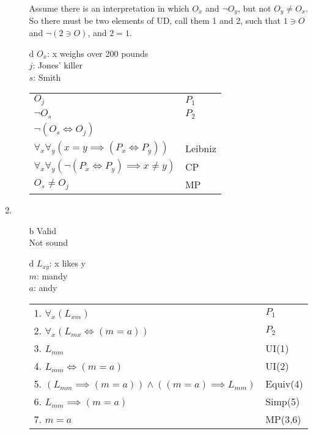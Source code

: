 \documentclass{article}
\begin{document}
\begin{enumerate}
\begin{enumerate}
					Assume there is an interpretation in which $O_x$ and $\lnot O_y$, but not $O_y \neq O_x$. So there must be two elements of UD, call them 1 and 2, such that $1 \ni O$ and $\lnot (2 \ni O)$, and $2 = 1$. 
				\item[d]
					$O_x$: x weighs over 200 pounds\\
					$j$: Jones' killer\\
					$s$: Smith\\
					\begin{tabular}{l l}
						$O_j$ & $P_1$\\
						$\lnot O_s$ & $P_2$\\
						$\lnot (O_s \iff O_j)$ & \\
						$\forall _x \forall _y(x=y \implies (P_x \iff P_y))$ & Leibniz\\
						$\forall _x \forall _y(\lnot (P_x \iff P_y) \implies x \neq y)$ & CP\\
						$O_s \neq O_j$ & MP\\
					\end{tabular}
			\end{enumerate}
		\item
			\begin{enumerate}
				\item[b]
					Valid\\
					Not sound	
				\item[d]
					$L_{xy}$: x likes y\\ 
					$m$: mandy\\
					$a$: andy\\
					\begin{tabular}{l l}
						1. $\forall _x(L_{xm})$ & $P_1$\\
						2. $\forall _x(L_{mx} \iff (m = a))$ & $P_2$\\
						3. $L_{mm}$ & UI(1)\\
						4. $L_{mm} \iff (m = a)$ & UI(2)\\
						5. $(L_{mm} \implies (m = a)) \land ((m = a) \implies L_{mm})$ & Equiv(4)\\
						6. $L_{mm} \implies (m = a)$ & Simp(5)\\
						7. $m = a$ & MP(3,6)
					\end{tabular}


\end{enumerate}
\end{enumerate}
\end{document}
